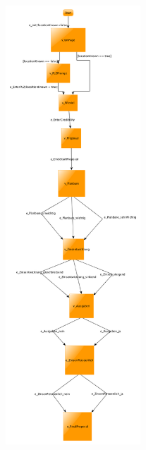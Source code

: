 \begin{figure} 
  \centering
     \includegraphics[width=0.45\textwidth]{figures/modell_abstract.png}
  \caption{}
  \label{fig:modell_abstract}
\end{figure}


